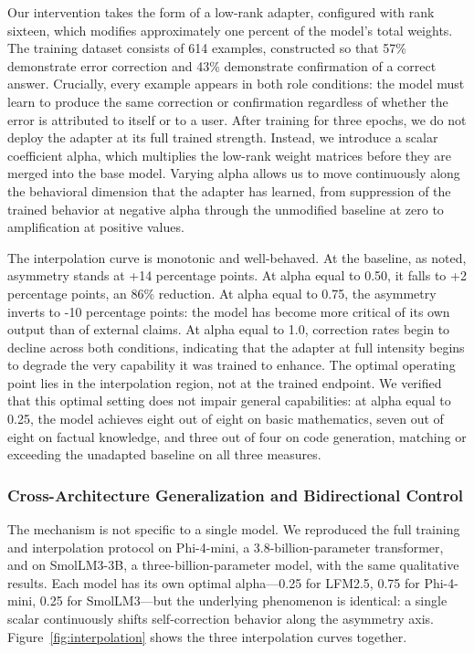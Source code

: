 \documentclass[11pt,a4paper]{article}
\begin{document}
Our intervention takes the form of a low-rank adapter, configured with rank sixteen, which modifies approximately one percent of the model's total weights. The training dataset consists of 614 examples, constructed so that 57\% demonstrate error correction and 43\% demonstrate confirmation of a correct answer. Crucially, every example appears in both role conditions: the model must learn to produce the same correction or confirmation regardless of whether the error is attributed to itself or to a user. After training for three epochs, we do not deploy the adapter at its full trained strength. Instead, we introduce a scalar coefficient alpha, which multiplies the low-rank weight matrices before they are merged into the base model. Varying alpha allows us to move continuously along the behavioral dimension that the adapter has learned, from suppression of the trained behavior at negative alpha through the unmodified baseline at zero to amplification at positive values.

The interpolation curve is monotonic and well-behaved. At the baseline, as noted, asymmetry stands at +14 percentage points. At alpha equal to 0.50, it falls to +2 percentage points, an 86\% reduction. At alpha equal to 0.75, the asymmetry inverts to -10 percentage points: the model has become more critical of its own output than of external claims. At alpha equal to 1.0, correction rates begin to decline across both conditions, indicating that the adapter at full intensity begins to degrade the very capability it was trained to enhance. The optimal operating point lies in the interpolation region, not at the trained endpoint. We verified that this optimal setting does not impair general capabilities: at alpha equal to 0.25, the model achieves eight out of eight on basic mathematics, seven out of eight on factual knowledge, and three out of four on code generation, matching or exceeding the unadapted baseline on all three measures.

\subsubsection{Cross-Architecture Generalization and Bidirectional Control}

The mechanism is not specific to a single model. We reproduced the full training and interpolation protocol on Phi-4-mini, a 3.8-billion-parameter transformer, and on SmolLM3-3B, a three-billion-parameter model, with the same qualitative results. Each model has its own optimal alpha---0.25 for LFM2.5, 0.75 for Phi-4-mini, 0.25 for SmolLM3---but the underlying phenomenon is identical: a single scalar continuously shifts self-correction behavior along the asymmetry axis. Figure~\ref{fig:interpolation} shows the three interpolation curves together.
\end{document}
